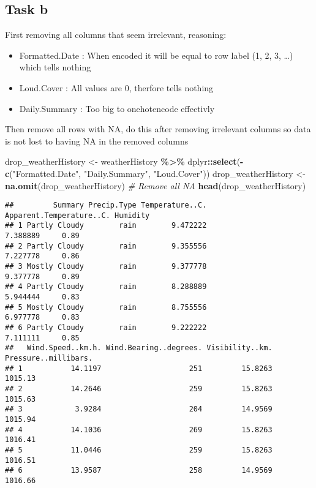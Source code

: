 \documentclass[
]{article}
\newenvironment{Shaded}{\begin{snugshade}}{\end{snugshade}}
\newcommand{\CommentTok}[1]{\textcolor[rgb]{0.56,0.35,0.01}{\textit{#1}}}
\newcommand{\FunctionTok}[1]{\textcolor[rgb]{0.13,0.29,0.53}{\textbf{#1}}}
\newcommand{\NormalTok}[1]{#1}
\newcommand{\OtherTok}[1]{\textcolor[rgb]{0.56,0.35,0.01}{#1}}
\newcommand{\SpecialCharTok}[1]{\textcolor[rgb]{0.81,0.36,0.00}{\textbf{#1}}}
\newcommand{\StringTok}[1]{\textcolor[rgb]{0.31,0.60,0.02}{#1}}
\providecommand{\tightlist}{%
  \setlength{\itemsep}{0pt}\setlength{\parskip}{0pt}}
\begin{document}
\subsection{Task b}\label{task-b-1}

First removing all columns that seem irrelevant, reasoning:

\begin{itemize}
\tightlist
\item
  Formatted.Date : When encoded it will be equal to row label (1, 2, 3,
  \ldots) which tells nothing
\item
  Loud.Cover : All values are 0, therfore tells nothing
\item
  Daily.Summary : Too big to onehotencode effectivly
\end{itemize}

Then remove all rows with NA, do this after removing irrelevant columns
so data is not lost to having NA in the removed columns

\begin{Shaded}
\begin{Highlighting}[]
\NormalTok{drop\_weatherHistory }\OtherTok{\textless{}{-}}\NormalTok{ weatherHistory }\SpecialCharTok{\%\textgreater{}\%}\NormalTok{ dplyr}\SpecialCharTok{::}\FunctionTok{select}\NormalTok{(}\SpecialCharTok{{-}}\FunctionTok{c}\NormalTok{(}\StringTok{"Formatted.Date"}\NormalTok{, }\StringTok{"Daily.Summary"}\NormalTok{, }\StringTok{"Loud.Cover"}\NormalTok{))}
\NormalTok{drop\_weatherHistory }\OtherTok{\textless{}{-}} \FunctionTok{na.omit}\NormalTok{(drop\_weatherHistory) }\CommentTok{\# Remove all NA}
\FunctionTok{head}\NormalTok{(drop\_weatherHistory)}
\end{Highlighting}
\end{Shaded}

\begin{verbatim}
##         Summary Precip.Type Temperature..C. Apparent.Temperature..C. Humidity
## 1 Partly Cloudy        rain        9.472222                 7.388889     0.89
## 2 Partly Cloudy        rain        9.355556                 7.227778     0.86
## 3 Mostly Cloudy        rain        9.377778                 9.377778     0.89
## 4 Partly Cloudy        rain        8.288889                 5.944444     0.83
## 5 Mostly Cloudy        rain        8.755556                 6.977778     0.83
## 6 Partly Cloudy        rain        9.222222                 7.111111     0.85
##   Wind.Speed..km.h. Wind.Bearing..degrees. Visibility..km. Pressure..millibars.
## 1           14.1197                    251         15.8263              1015.13
## 2           14.2646                    259         15.8263              1015.63
## 3            3.9284                    204         14.9569              1015.94
## 4           14.1036                    269         15.8263              1016.41
## 5           11.0446                    259         15.8263              1016.51
## 6           13.9587                    258         14.9569              1016.66
\end{verbatim}
\end{document}
